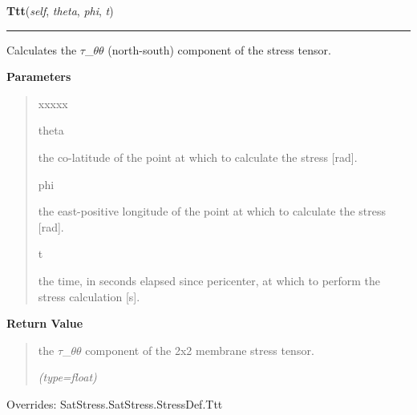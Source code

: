    \vspace{0.5ex}

\hspace{.8\funcindent}\begin{boxedminipage}{\funcwidth}

    \raggedright \textbf{Ttt}(\textit{self}, \textit{theta}, \textit{phi}, \textit{t})

    \vspace{-1.5ex}

    \rule{\textwidth}{0.5\fboxrule}
\setlength{\parskip}{2ex}
    Calculates the \(\tau\)\_\(\theta\)\(\theta\) (north-south) component 
    of the stress tensor.

\setlength{\parskip}{1ex}
      \textbf{Parameters}
      \vspace{-1ex}

      \begin{quote}
        \begin{Ventry}{xxxxx}

          \item[theta]

          the co-latitude of the point at which to calculate the stress 
          [rad].

          \item[phi]

          the east-positive longitude of the point at which to calculate 
          the stress [rad].

          \item[t]

          the time, in seconds elapsed since pericenter, at which to 
          perform the stress calculation [s].

        \end{Ventry}

      \end{quote}

      \textbf{Return Value}
    \vspace{-1ex}

      \begin{quote}
      the \(\tau\)\_\(\theta\)\(\theta\) component of the 2x2 membrane 
      stress tensor.

      {\it (type=float)}

      \end{quote}

      Overrides: SatStress.SatStress.StressDef.Ttt

    \end{boxedminipage}

